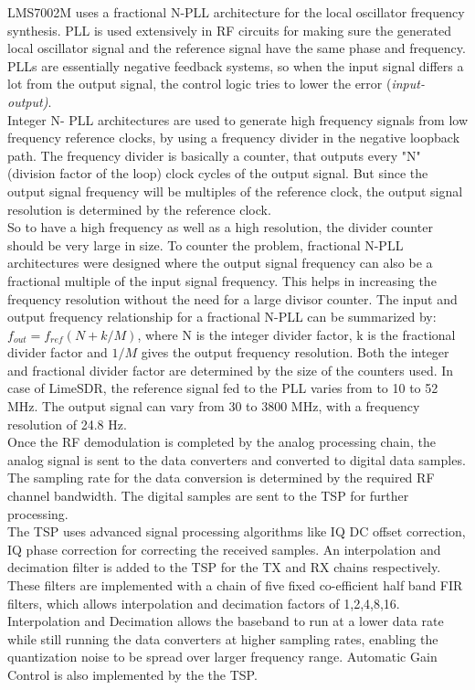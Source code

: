 LMS7002M uses a fractional N-\ac{PLL} architecture for the local oscillator frequency synthesis.
\ac{PLL} is used extensively in \ac{RF} circuits for making sure the generated local oscillator signal and the reference signal have the same phase and frequency.
PLLs are essentially negative feedback systems, so when the input signal differs a lot from the output signal, the control logic tries to lower the error (\textit{input-output)}.\\

Integer N- \ac{PLL} architectures are used to generate high frequency signals from low frequency reference clocks, by using a frequency divider in the negative loopback path.
The frequency divider is basically a counter, that outputs every "N" (division factor of the loop) clock cycles of the output signal.
But since the output signal frequency will be multiples of the reference clock, the output signal resolution is determined by the  reference clock.\\

So to have a high frequency as well as a high resolution, the divider counter should be very large in size.
To counter the problem, fractional N-{PLL} architectures were designed where the output signal frequency can also be a fractional multiple of the input signal frequency.
This helps in increasing the frequency resolution without the need for a large divisor counter.
The input and output frequency relationship for a fractional  N-\ac{PLL} can be summarized by: $f_{out}=f_{ref}(N+k/M)$, where N is the integer divider factor, k is the fractional divider factor and $1/M$ gives the output frequency resolution.
Both the integer and fractional divider factor are determined by the size of the counters used.
In case of LimeSDR, the reference signal fed to the PLL varies from to 10 to 52 MHz.
The output signal can vary from 30 to 3800 MHz, with a frequency resolution of 24.8 Hz.\\

Once the \ac{RF} demodulation is completed by the analog processing chain, the analog signal is sent to the data converters and converted to digital data samples.
The sampling rate for the data conversion is determined by the required \ac{RF} channel bandwidth.
The digital samples are sent to the \ac{TSP} for further processing.\\

The \ac{TSP} uses advanced signal processing algorithms like IQ DC offset correction, IQ phase correction for correcting the received samples.
An interpolation and decimation filter is added to the \ac{TSP} for the TX and RX chains respectively.
These filters are implemented with a chain of five fixed co-efficient half band \ac{FIR} filters, which allows interpolation and decimation factors of 1,2,4,8,16.
Interpolation and Decimation allows the baseband to run at a lower data rate while still running the data converters at higher sampling rates, enabling the quantization noise to be spread over larger frequency range.
Automatic Gain Control is also implemented by the the \ac{TSP}.\\


